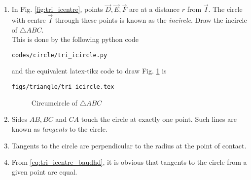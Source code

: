 \renewcommand{\theequation}{\theenumi}
\begin{enumerate}[label=\arabic*.,ref=\thesubsection.\theenumi]

\item In Fig. \ref{fig:tri_icentre}, points $\vec{D}, \vec{E}, \vec{F}$  are at a distance $r$ from $\vec{I}$.  The circle with centre $\vec{I}$ through these points is known as the {\em incircle}. Draw the incircle of $\triangle ABC$.
%
\\
\solution This is done by the following python code
%
\begin{lstlisting}
codes/circle/tri_icircle.py
\end{lstlisting}
%
and the equivalent latex-tikz code to draw Fig. \ref{fig:tri_icircle} is
%
\begin{lstlisting}
figs/triangle/tri_icircle.tex
\end{lstlisting}

\begin{figure}[!ht]
	\begin{center}
		
		\resizebox{\columnwidth}{!}{}
	\end{center}
	\caption{Circumcircle of $\triangle ABC$}
	\label{fig:tri_icircle}	
\end{figure}
%
\item Sides $AB, BC$ and $CA$ touch the circle at exactly one point.  Such lines are known as {\em tangents} to the circle.
\item Tangents to the circle are perpendicular to the radius at the point of contact.
\item From \eqref{eq:tri_icentre_baudhd}, it is  obvious that tangents to the circle from a given point are equal.
%

\end{enumerate}

